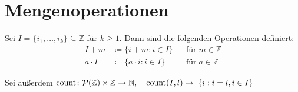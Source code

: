 \section{Mengenoperationen}

\begin{definition}
    Sei $I = \{i_1,\dots,i_k\} \subseteq \mathbb{Z}$ für $k \geq 1$. Dann sind die folgenden Operationen definiert:
    \begin{align*}
        I + m       &\coloneq \{i + m: i \in I\}               && \text{für} \; m \in \mathbb{Z} \\
        a \cdot I   &\coloneq \{a \cdot i: i \in I\}    && \text{für} \; a \in \mathbb{Z}
    \end{align*}

    Sei außerdem $\mathrm{count} \colon \mathcal{P}(\mathbb{Z}) \times \mathbb{Z} \to \mathbb{N}, \quad \mathrm{count}(I, l) \mapsto |\{i: i = l, i \in I\}|$
\end{definition}